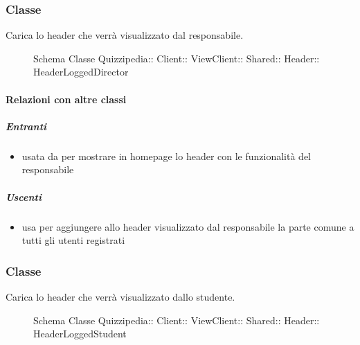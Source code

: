 \subsubsection{Classe }
Carica lo header che verrà visualizzato dal responsabile.
\begin{figure}[H]
\centering
\noindent{}
\caption[Schema Classe HeaderLoggedDirector]{Schema Classe Quizzipedia:: Client:: ViewClient:: Shared:: Header:: HeaderLoggedDirector}
\end{figure}
\paragraph{Relazioni con altre classi}
\subparagraph{Entranti}
\begin{itemize}
\item usata da  per mostrare in homepage lo header con le funzionalità del responsabile
\end{itemize}
\subparagraph{Uscenti}
\begin{itemize}
\item usa  per aggiungere allo header visualizzato dal responsabile la parte comune a tutti gli utenti registrati
\end{itemize}
\subsubsection{Classe }
Carica lo header che verrà visualizzato dallo studente.
\begin{figure}[H]
\centering
\noindent{}
\caption[Schema Classe HeaderLoggedStudent]{Schema Classe Quizzipedia:: Client:: ViewClient:: Shared:: Header:: HeaderLoggedStudent}
\end{figure}

